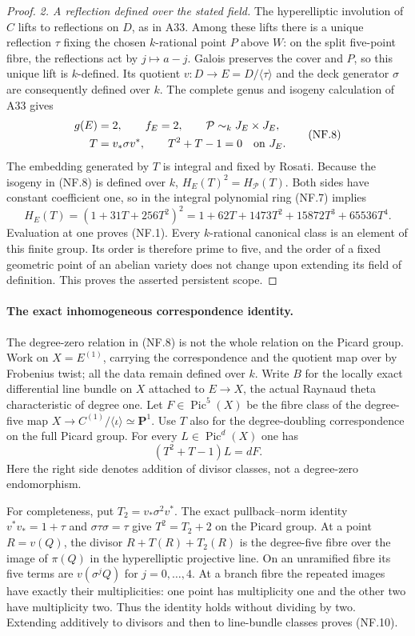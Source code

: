 \documentclass[11pt,a4paper]{article}
\begin{document}
\begin{proof}
\emph{2. A reflection defined over the stated field.}
The hyperelliptic involution of $C$ lifts to reflections on $D$,
as in A33. Among these lifts there is a unique reflection $\tau$
fixing the chosen $k$-rational point $P$ above $W$: on the split
five-point fibre, the reflections act by $j\mapsto a-j$.
Galois preserves the cover and $P$, so this unique lift is
$k$-defined. Its quotient $v:D\to E=D/\langle\tau\rangle$
and the deck generator $\sigma$ are consequently defined over $k$.
The complete genus and isogeny calculation of A33 gives
\[
 \begin{aligned}
 g(E)&=2,\qquad f_E=2,\qquad \mathcal P\sim_k J_E\times J_E,\\
 T&=v_*\sigma v^*,\qquad T^2+T-1=0\quad\hbox{on }J_E.
 \end{aligned}
 \tag{NF.8}
\]
The embedding generated by $T$ is integral and fixed by Rosati.
Because the isogeny in (NF.8) is defined over $k$,
$H_E(T)^2=H_{\mathcal P}(T)$. Both sides have constant
coefficient one, so in the integral polynomial ring (NF.7) implies
\[
 H_E(T)=(1+31T+256T^2)^2
      =1+62T+1473T^2+15872T^3+65536T^4.
 \tag{NF.9}
\]
Evaluation at one proves (NF.1). Every $k$-rational canonical
class is an element of this finite group. Its order is therefore
prime to five, and the order of a fixed geometric point of an
abelian variety does not change upon extending its field of
definition. This proves the asserted persistent scope.
\end{proof}

\paragraph{The exact inhomogeneous correspondence identity.}
The degree-zero relation in (NF.8) is not the whole relation on
the Picard group. Work on $X=E^{(1)}$, carrying the correspondence
and the quotient map over by Frobenius twist; all the data remain
defined over $k$. Write $B$ for the locally exact differential line
bundle on $X$ attached to $E\to X$, the actual Raynaud theta
characteristic of degree one. Let $F\in\operatorname{Pic}^5(X)$
be the fibre class of the degree-five map
$X\to C^{(1)}/\langle\iota\rangle\simeq\mathbf P^1$.
Use $T$ also for the degree-doubling correspondence on the full
Picard group. For every $L\in\operatorname{Pic}^d(X)$ one has
\[
                       (T^2+T-1)L=dF.
 \tag{NF.10}
\]
Here the right side denotes addition of divisor classes, not a
degree-zero endomorphism.

For completeness, put $T_2=v_*\sigma^2v^*$. The exact
pullback--norm identity $v^*v_*=1+\tau$ and
$\sigma\tau\sigma=\tau$ give
$T^2=T_2+2$ on the Picard group. At a point $R=v(Q)$,
the divisor $R+T(R)+T_2(R)$ is the degree-five fibre over the
image of $\pi(Q)$ in the hyperelliptic projective line. On an
unramified fibre its five terms are $v(\sigma^jQ)$ for
$j=0,\ldots,4$. At a branch fibre the repeated images have
exactly their multiplicities: one point has multiplicity one and
the other two have multiplicity two. Thus the identity holds
without dividing by two. Extending additively to divisors and
then to line-bundle classes proves (NF.10).
\end{document}

